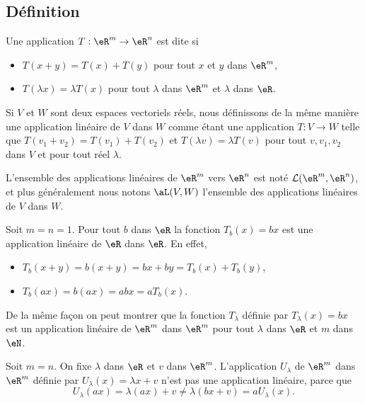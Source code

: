 \subsection{Définition}

\begin{definition}
	Une application $T: \eR^m\to\eR^n$ est dite  si 
\begin{itemize}
\item $T(x+y)=T(x)+T(y)$ pour tout $x$ et $y$ dans $\eR^m$,  
\item $T(\lambda x)=\lambda T(x)$ pour tout $\lambda$ dans $\eR^m$ et $\lambda$ dans $\eR$.
\end{itemize}
\end{definition}

Si $V$ et $W$ sont deux espaces vectoriels réels, nous définissons de la même manière une application linéaire de $V$ dans $W$ comme étant une application $T\colon V\to W$ telle que $T(v_1+v_2)=T(v_1)+T(v_2)$ et $T(\lambda v)=\lambda T(v)$ pour tout $v,v_1,v_2$ dans $V$ et pour tout réel $\lambda$.

L'ensemble des applications linéaires de $\eR^m$ vers $\eR^n$ est noté $\mathcal{L}(\eR^m, \eR^n)$, et plus généralement nous notons $\aL(V,W)$ l'ensemble des applications linéaires de $V$ dans $W$. 

\begin{example}
Soit $m=n=1$. Pour tout $b$ dans $\eR$ la fonction $T_b(x)= bx$ est une application linéaire de $\eR$ dans $\eR$. En effet,
\begin{itemize}
\item  $T_b(x+y)= b(x+y)= bx + by = T_b(x)+T_b(y)$,
\item $T_b(ax)=b(ax)= abx = a T_b(x)$.
\end{itemize}
De la même façon on peut montrer que la fonction $T_{\lambda}$ définie par $T_{\lambda}(x)=bx$ est un application linéaire de $\eR^m$ dans $\eR^m$ pour tout $\lambda$ dans $\eR$ et $m$ dans $\eN$.
\end{example}

\begin{example}\label{ex_affine}
	Soit $m=n$. On fixe $\lambda$ dans $\eR$ et $v$ dans $\eR^m$. L'application $U_{\lambda}$ de $\eR^m$ dans $\eR^m$ définie par $U_{\lambda}(x)=\lambda x+v$ n'est pas une application linéaire, parce que 
\[
U_{\lambda}(ax)=\lambda(ax)+v\neq \lambda(bx+v)=a U_{\lambda}(x).
\]
\end{example}

